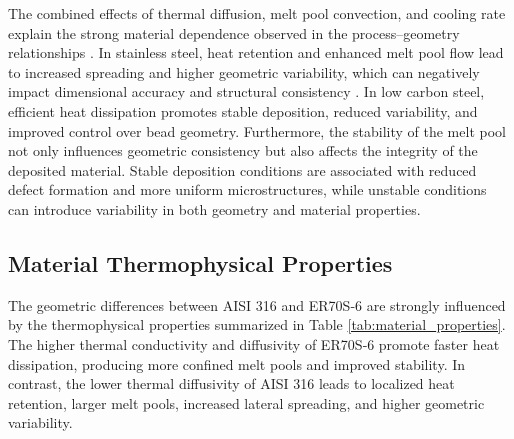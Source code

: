 \documentclass[conference]{IEEEtran}
\begin{document}
The combined effects of thermal diffusion, melt pool convection, and cooling rate explain the strong material dependence observed in the process--geometry relationships \cite{chen2023waam_mech,fouad2025}. In stainless steel, heat retention and enhanced melt pool flow lead to increased spreading and higher geometric variability, which can negatively impact dimensional accuracy and structural consistency \cite{wang2023meltpool}. In low carbon steel, efficient heat dissipation promotes stable deposition, reduced variability, and improved control over bead geometry. Furthermore, the stability of the melt pool not only influences geometric consistency but also affects the integrity of the deposited material. Stable deposition conditions are associated with reduced defect formation and more uniform microstructures, while unstable conditions can introduce variability in both geometry and material properties.

\subsection{Material Thermophysical Properties}
\begin{table}[t]
\centering
\caption{Thermophysical properties of materials used in this study.}
\label{tab:material_properties}


\end{table}
The geometric differences between AISI 316 and ER70S‑6 are strongly influenced by the thermophysical properties summarized in Table \ref{tab:material_properties}. The higher thermal conductivity and diffusivity of ER70S‑6 promote faster heat dissipation, producing more confined melt pools and improved stability. In contrast, the lower thermal diffusivity of AISI 316 leads to localized heat retention, larger melt pools, increased lateral spreading, and higher geometric variability.
\end{document}
